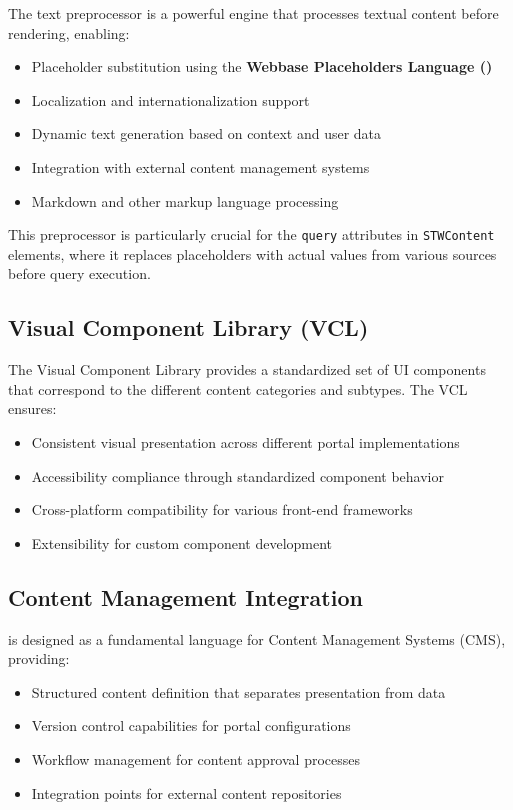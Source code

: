 The \wbdl{} text preprocessor is a powerful engine that processes textual content before rendering, enabling:

\begin{itemize}
\item Placeholder substitution using the \textbf{Webbase Placeholders Language (\wbpl{})}
\item Localization and internationalization support
\item Dynamic text generation based on context and user data
\item Integration with external content management systems
\item Markdown and other markup language processing
\end{itemize}

This preprocessor is particularly crucial for the \texttt{query} attributes in \texttt{STWContent} elements, where it replaces placeholders with actual values from various sources before query execution.

\subsection{Visual Component Library (VCL)}
\label{sec:vcl}

The Visual Component Library provides a standardized set of UI components that correspond to the different content categories and subtypes. The VCL ensures:

\begin{itemize}
\item Consistent visual presentation across different portal implementations
\item Accessibility compliance through standardized component behavior
\item Cross-platform compatibility for various front-end frameworks
\item Extensibility for custom component development
\end{itemize}

\subsection{Content Management Integration}
\label{sec:cms-integration}

\wbdl{} is designed as a fundamental language for Content Management Systems (CMS), providing:

\begin{itemize}
\item Structured content definition that separates presentation from data
\item Version control capabilities for portal configurations
\item Workflow management for content approval processes
\item Integration points for external content repositories
\end{itemize}

